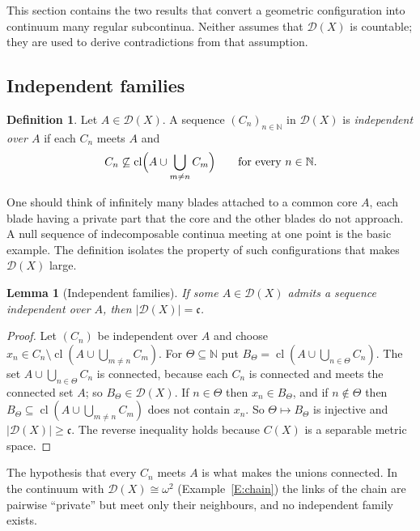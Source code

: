 \documentclass[11pt,reqno]{amsart}
\theoremstyle{plain}
\newtheorem{lemma}[theorem]{Lemma}
\theoremstyle{definition}
\newtheorem{definition}[theorem]{Definition}
\theoremstyle{remark}
\newcommand{\D}{\mathcal{D}}
\newcommand{\cl}{\operatorname{cl}}
\newcommand{\N}{\mathbb{N}}
\newcommand{\cc}{\mathfrak{c}}
\begin{document}
This section contains the two results that convert a geometric configuration into continuum many regular subcontinua. Neither assumes that $\D(X)$ is countable; they are used to derive contradictions from that assumption.

\subsection{Independent families}

\begin{definition}\label{D:independent}
Let $A\in\D(X)$. A sequence $(C_n)_{n\in\N}$ in $\D(X)$ is \emph{independent over $A$} if each $C_n$ meets $A$ and
\[
C_n\not\subseteq\cl\Bigl(A\cup\bigcup_{m\neq n}C_m\Bigr)\qquad\text{for every }n\in\N.
\]
\end{definition}

One should think of infinitely many blades attached to a common core $A$, each blade having a private part that the core and the other blades do not approach. A null sequence of indecomposable continua meeting at one point is the basic example. The definition isolates the property of such configurations that makes $\D(X)$ large.

\begin{lemma}[Independent families]\label{L:independent}
If some $A\in\D(X)$ admits a sequence independent over $A$, then $|\D(X)|=\cc$.
\end{lemma}

\begin{proof}
Let $(C_n)$ be independent over $A$ and choose $x_n\in C_n\setminus\cl(A\cup\bigcup_{m\neq n}C_m)$. For $\Theta\subseteq\N$ put $B_\Theta=\cl(A\cup\bigcup_{n\in\Theta}C_n)$. The set $A\cup\bigcup_{n\in\Theta}C_n$ is connected, because each $C_n$ is connected and meets the connected set $A$; so $B_\Theta\in\D(X)$. If $n\in\Theta$ then $x_n\in B_\Theta$, and if $n\notin\Theta$ then $B_\Theta\subseteq\cl(A\cup\bigcup_{m\neq n}C_m)$ does not contain $x_n$. So $\Theta\mapsto B_\Theta$ is injective and $|\D(X)|\ge\cc$. The reverse inequality holds because $C(X)$ is a separable metric space.
\end{proof}

The hypothesis that every $C_n$ meets $A$ is what makes the unions connected. In the continuum with $\D(X)\cong\omega^2$ (Example~\ref{E:chain}) the links of the chain are pairwise ``private'' but meet only their neighbours, and no independent family exists.
\end{document}
